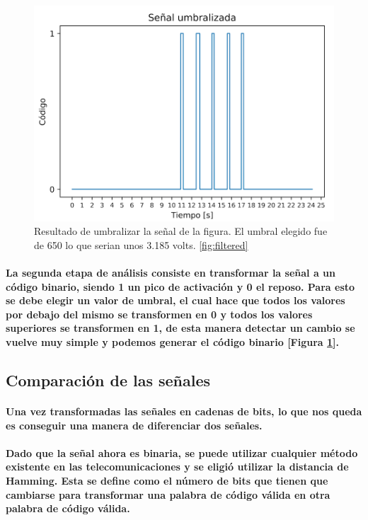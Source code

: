 \documentclass{article}
\begin{document}
\begin{figure}[ht]
    \centering
    \includegraphics[width=\textwidth]{umbralized.png}%
    \caption{Resultado de umbralizar la señal de la figura. El umbral elegido fue de 650 lo que serian unos 3.185 volts.
    \ref{fig:filtered}}
    \label{fig:umbralized}
\end{figure}

\paragraph{
La segunda etapa de análisis consiste en transformar la señal a un código binario, siendo 1 un pico de activación y 0 el reposo. Para esto se debe elegir un valor de umbral, el cual hace que todos los valores por debajo del mismo se transformen en 0 y todos los valores superiores se transformen en 1, de esta manera detectar un cambio se vuelve muy simple y podemos generar el código binario [Figura \ref{fig:umbralized}].
}
\subsection{Comparación de las señales}
\paragraph{
Una vez transformadas las señales en cadenas de bits, lo que nos queda es conseguir una manera de diferenciar dos señales.
}
\paragraph{
Dado que la señal ahora es binaria, se puede utilizar cualquier método existente en las telecomunicaciones y se eligió utilizar la distancia de Hamming. Esta se define como el número de bits que tienen que cambiarse para transformar una palabra de código válida en otra palabra de código válida.
}
\end{document}
